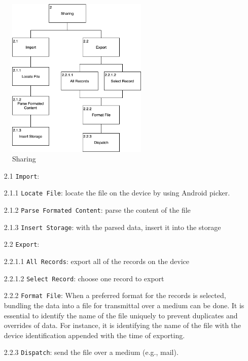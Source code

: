 \begin{figure}
    \centering
    \includegraphics[width=0.6\textwidth]{images/Sharing.png}
    \caption{Sharing}
    \label{fig:hta_sharing}
\end{figure}

\begin{itemize}
    \item[2.1] \verb|Import|:
    \item[2.1.1] \verb|Locate File|: locate the file on the device by using Android picker.
    \item[2.1.2] \verb|Parse Formated Content|: parse the content of the file 
    \item[2.1.3] \verb|Insert Storage|: with the parsed data, insert it into the storage 
    \item[2.2] \verb|Export|:
    \item[2.2.1.1] \verb|All Records|: export all of the records on the device 
    \item[2.2.1.2] \verb|Select Record|: choose one record to export 
    \item[2.2.2] \verb|Format File|: When a preferred format for the records is selected, bundling the data into a file for transmittal over a medium can be done. It is essential to identify the name of the file uniquely to prevent duplicates and overrides of data. For instance, it is identifying the name of the file with the device identification appended with the time of exporting. 
    \item[2.2.3] \verb|Dispatch|: send the file over a medium (e.g., mail).
\end{itemize}

